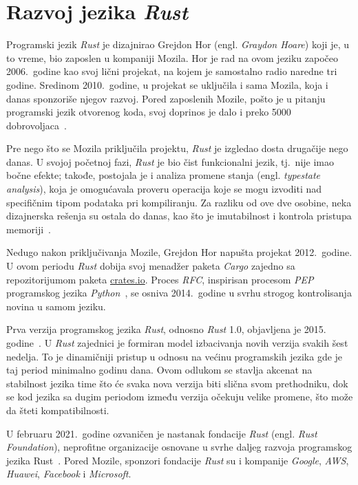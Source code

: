 \documentclass[12pt,oneside]{memoir}
\begin{document}
\section{Razvoj jezika \emph{Rust}}
Programski jezik \emph{Rust} je dizajnirao Grejdon Hor
(engl. \emph{Graydon Hoare}) koji je, u to vreme, bio zaposlen u kompaniji
Mozila.
Hor je rad na ovom jeziku započeo 2006.\ godine kao svoj lični projekat,
na kojem je samostalno radio naredne tri godine.
Sredinom 2010.\ godine, u projekat se
uključila i sama Mozila, koja i danas sponzoriše njegov razvoj.
Pored zaposlenih Mozile, pošto je u pitanju programski jezik otvorenog koda,
svoj doprinos je dalo i preko 5000 dobrovoljaca~\cite{thanks_rust}.

Pre nego što se Mozila priključila projektu, \emph{Rust} je izgledao dosta
drugačije nego danas. U svojoj početnoj fazi, \emph{Rust} je bio čist funkcionalni jezik,
tj.\ nije imao bočne efekte; takođe, postojala je i analiza promene stanja
(engl. \emph{typestate analysis}), koja je omogućavala proveru operacija
koje se mogu izvoditi nad specifičnim tipom podataka pri kompiliranju. Za
razliku od ove dve osobine, neka dizajnerska rešenja su ostala do danas, kao
što je imutabilnost i kontrola pristupa memoriji~\cite{history_rust}.

Nedugo nakon priključivanja Mozile, Grejdon Hor napušta projekat
2012.\ godine. U ovom periodu \emph{Rust} dobija svoj menadžer
paketa \emph{Cargo} zajedno sa repozitorijumom paketa \url{crates.io}.
Proces \emph{RFC}, inspirisan procesom \emph{PEP} programskog jezika
\emph{Python}~\cite{python_pep}, se
osniva 2014.\ godine u svrhu strogog kontrolisanja novina u samom jeziku.

Prva verzija programskog jezika \emph{Rust}, odnosno \emph{Rust} 1.0, objavljena je 2015.
godine~\cite{stable_rust}. U \emph{Rust} zajednici je formiran model izbacivanja novih
verzija svakih šest nedelja. To je dinamičniji pristup
u odnosu na većinu programskih jezika gde je taj period minimalno godinu dana.
Ovom odlukom se stavlja akcenat na stabilnost jezika time što će svaka nova
verzija biti slična svom prethodniku, dok se kod jezika sa dugim periodom
između verzija očekuju velike promene, što može da šteti kompatibilnosti.

U februaru 2021.\ godine ozvaničen je nastanak fondacije \emph{Rust} (engl.
\textit{Rust Foundation}), neprofitne organizacije osnovane u svrhe daljeg razvoja programskog
jezika Rust~\cite{rust_foundation}. Pored Mozile, sponzori fondacije \emph{Rust} su i kompanije
\emph{Google}, \emph{AWS}, \emph{Huawei}, \emph{Facebook} i \emph{Microsoft}.
\end{document}
